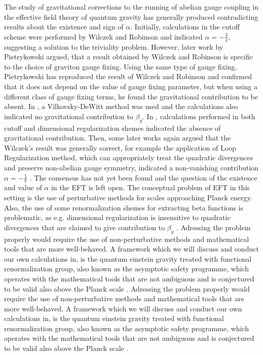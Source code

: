 \documentclass[11pt, a4paper]{article}
\begin{document}
The study of gravitational corrections to the running of abelian gauge coupling in the effective field theory of quantum gravity has generally produced contradicting results about the existence and sign of $\alpha$.
Initially, calculations in the cutoff scheme were performed by Wilczek and Robinson \cite{wilczek} and indicated
$\alpha = - \frac{3}{\pi} $, suggesting a solution to the triviality problem.
However, later work by Pietrykowski \cite{pietrykowski} argued, that a result obtained by Wilczek and Robinson is specific to the choice of graviton gauge fixing.
Using the same type of gauge fixing, Pietrykowski has reproduced the result of Wilczek and Robinson and confirmed that it does not depend on the value of gauge fixing parameter, but when using a different class of gauge fixing terms, he found the gravitational contribution to be absent.
In \cite{toms}, a Vilkovsky-DeWitt method was used and the calculations also indicated no gravitational contribution to $\beta_g$.
In \cite{absence}, calculations performed in both cutoff and dimensional regularization shemes indicated the absence of gravitational contribution.
Then, some later works again argued that the Wilczek's result was generally correct, for example the application of Loop Regularization method, which can appropriately treat the quadratic divergences and preserve non-abelian gauge symmetry,
indicated a non-vanishing contribution $\alpha = -\frac{1}{\pi} $ \cite{tang}.
The consensus has not yet been found and the question of the existence and value of $\alpha$ in the EFT is left open.
The conceptual problem of EFT in this setting is the use of perturbative methods for scales approaching Planck energy.
Also, the use of some renormalization shemes for extracting beta functions is problematic, as e.g. dimensional regularization is insensitive to quadratic
divergences that are claimed to give contribution to $\beta_g$ \cite{absence}.
Adressing the problem properly would require the use of non-perturbative methods and mathematical tools that are more well-behaved.
A framework which we will discuss and conduct our own calculations in, is the quantum einstein gravity treated with functional renormalization group, also known as the asymptotic safety programme, which operates with the mathematical tools that are not ambiguous and
is conjectured to be valid also above the Planck scale \cite{qeg}.
Adressing the problem properly would require the use of non-perturbative methods and mathematical tools that are more well-behaved.
A framework which we will discuss and conduct our own calculations in, is the quantum einstein gravity treated with functional renormalization group, also known as the asymptotic safety programme, which operates with the mathematical tools that are not ambiguous and
is conjectured to be valid also above the Planck scale \cite{qeg}.
\end{document}
